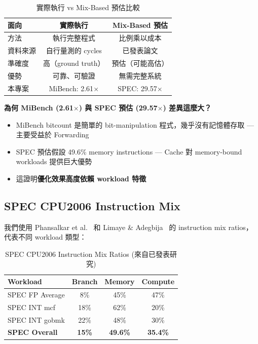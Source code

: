 \documentclass[journal]{IEEEtran}
\begin{document}
\begin{table}[!t]
\centering
\caption{實際執行 vs Mix-Based 預估比較}
\label{tab:comparison}
\footnotesize
\begin{tabular}{@{}lcc@{}}
\toprule
\textbf{面向} & \textbf{實際執行} & \textbf{Mix-Based 預估} \\
\midrule
方法 & 執行完整程式 & 比例乘以成本 \\
資料來源 & 自行量測的 cycles & 已發表論文 \\
準確度 & 高（ground truth） & 預估（可能高估） \\
優勢 & 可靠、可驗證 & 無需完整系統 \\
本專案 & MiBench: 2.61$\times$ & SPEC: 29.57$\times$ \\
\bottomrule
\end{tabular}
\end{table}

\textbf{為何 MiBench (2.61$\times$) 與 SPEC 預估 (29.57$\times$) 差異這麼大？}
\begin{itemize}
    \item MiBench bitcount 是簡單的 bit-manipulation 程式，幾乎沒有記憶體存取 --- 主要受益於 Forwarding
    \item SPEC 預估假設 49.6\% memory instructions --- Cache 對 memory-bound workloads 提供巨大優勢
    \item 這證明\textbf{優化效果高度依賴 workload 特徵}
\end{itemize}

\subsection{SPEC CPU2006 Instruction Mix}
我們使用 Phansalkar et al.~\cite{phansalkar2007analysis} 和 Limaye \& Adegbija~\cite{limaye2018workload} 的 instruction mix ratios，代表不同 workload 類型：

\begin{table}[!t]
\centering
\caption{SPEC CPU2006 Instruction Mix Ratios (來自已發表研究)}
\label{tab:specmix}
\footnotesize
\begin{tabular}{@{}lccc@{}}
\toprule
\textbf{Workload} & \textbf{Branch} & \textbf{Memory} & \textbf{Compute} \\
\midrule
SPEC FP Average & 8\% & 45\% & 47\% \\
SPEC INT mcf & 18\% & 62\% & 20\% \\
SPEC INT gobmk & 22\% & 48\% & 30\% \\
\textbf{SPEC Overall} & \textbf{15\%} & \textbf{49.6\%} & \textbf{35.4\%} \\
\bottomrule
\end{tabular}
\end{table}
\end{document}
